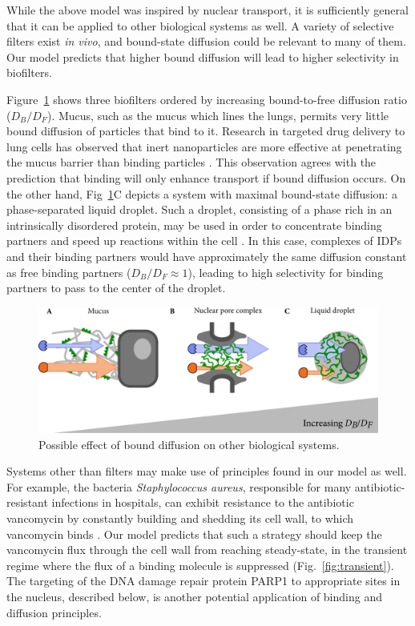 While the above model was inspired by nuclear transport, it is sufficiently general that it can be applied to other biological systems as well.  A variety of selective filters exist \textit{in vivo}, and bound-state diffusion could be relevant to many of them.  Our model predicts that higher bound diffusion will lead to higher selectivity in biofilters.  

Figure~\ref{fig:other-filters} shows three biofilters ordered by increasing bound-to-free diffusion ratio ($D_B/D_F$).  Mucus, such as the mucus which lines the lungs, permits very little bound diffusion of particles that bind to it.  Research in targeted drug delivery to lung cells has observed that inert nanoparticles are more effective at penetrating the mucus barrier than binding particles \cite{witten17}.  This observation agrees with the prediction that binding will only enhance transport if bound diffusion occurs.   On the other hand, Fig~\ref{fig:other-filters}C depicts a system with maximal bound-state diffusion: a phase-separated liquid droplet.  Such a droplet, consisting of a phase rich in an intrinsically disordered protein, may be used in order to concentrate binding partners and speed up reactions within the cell \cite{brangwynne15, feric16}.  In this case, complexes of IDPs and their binding partners would have approximately the same diffusion constant as free binding partners ($D_B/D_F \approx 1$), leading to high selectivity for binding partners to pass to the center of the droplet.

\begin{figure}
\centering
\includegraphics[width=0.8\linewidth]{figs/ch02/concluding-cartoon-large.pdf}
\caption[Bound diffusion in other systems.]{Possible effect of bound diffusion on other biological systems.}
\label{fig:other-filters}
\end{figure}

Systems other than filters may make use of principles found in our model as well.  For example, the bacteria \textit{Staphylococcus aureus}, responsible for many antibiotic-resistant infections in hospitals, can exhibit resistance to the antibiotic vancomycin by constantly building and shedding its cell wall, to which vancomycin binds \cite{mcguinness17}.  Our model predicts that such a strategy should keep the vancomycin flux through the cell wall from reaching steady-state, in the transient regime where the flux of a binding molecule is suppressed (Fig.~\ref{fig:transient}).  The targeting of the DNA damage repair protein PARP1 to appropriate sites in the nucleus, described below, is another potential application of binding and diffusion principles.


